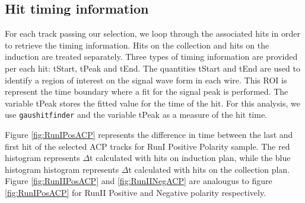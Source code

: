 \subsection{Hit timing information}\label{sec:HitTime}
For each track passing our selection, we loop through the associated hits in order to retrieve the timing information. Hits on the collection and hits on the induction are treated separately. Three types of timing information are provided per each hit: tStart, tPeak and tEnd. The quantities tStart and tEnd are used to identify a region of interest on the signal wave form in each wire. This ROI is represent the time boundary where a fit for the signal peak is performed. The variable tPeak stores the fitted value for the time of the hit. For this analysis, we use \verb!gaushitfinder! and the variable tPeak as a measure of the hit time.


Figure \ref{fig:RunIPosACP} represents the difference in time between the last and first hit of the selected ACP tracks for RunI Positive Polarity sample. The red histogram represents $\Delta$t calculated with hits on induction plan, while the blue histogram histogram represents $\Delta$t calculated with hits on the collection plan.
Figure \ref{fig:RunIIPosACP} and \ref{fig:RunIINegACP} are analougus to figure \ref{fig:RunIPosACP} for RunII Positive and Negative polarity respectively.

